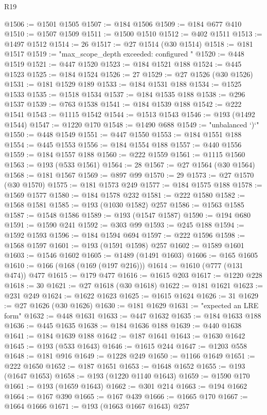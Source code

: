 \begin{lexlean}{R19}
\begin{coremodule}
@1506 := @1501 @1505
@1507 := @184 @1506
@1509 := @184 @677 @410
@1510 := @1507 @1509
@1511 := @1500 @1510
@1512 := @402 @1511
@1513 := @1497 @1512
@1514 := 26
@1517 := @27 @1514 (@30 @1514)
@1518 := @181 @1517
@1519 := "max_scope_depth exceeded: configured "
@1520 := @448 @1519
@1521 := @447 @1520
@1523 := @184 @1521 @188
@1524 := @445 @1523
@1525 := @184 @1524
@1526 := 27
@1529 := @27 @1526 (@30 @1526)
@1531 := @181 @1529 @189
@1533 := @184 @1531 @188
@1534 := @1525 @1533
@1535 := @1518 @1534
@1537 := @184 @1535 @188
@1538 := @296 @1537
@1539 := @763 @1538
@1541 := @184 @1539 @188
@1542 := @222 @1541
@1543 := @1115 @1542
@1544 := @1513 @1543
@1546 := @193 (@1492 @1544)
@1547 := @1220 @170
@1548 := @1490 @688
@1549 := "unbalanced `)`"
@1550 := @448 @1549
@1551 := @447 @1550
@1553 := @184 @1551 @188
@1554 := @445 @1553
@1556 := @184 @1554 @188
@1557 := @440 @1556
@1559 := @184 @1557 @188
@1560 := @222 @1559
@1561 := @1115 @1560
@1563 := @193 (@533 @1561)
@1564 := 28
@1567 := @27 @1564 (@30 @1564)
@1568 := @181 @1567
@1569 := @897 @99
@1570 := 29
@1573 := @27 @1570 (@30 @1570)
@1575 := @181 @1573 @249
@1577 := @184 @1575 @188
@1578 := @1569 @1577
@1580 := @184 @1578 @232
@1581 := @222 @1580
@1582 := @1568 @1581
@1585 := @193 (@1030 @1582) @257
@1586 := @1563 @1585
@1587 := @1548 @1586
@1589 := @193 (@1547 @1587)
@1590 := @194 @680
@1591 := @1590 @241
@1592 := @303 @99
@1593 := @245 @188
@1594 := @1592 @1593
@1596 := @184 @1594 @694
@1597 := @222 @1596
@1598 := @1568 @1597
@1601 := @193 (@1591 @1598) @257
@1602 := @1589 @1601
@1603 := @1546 @1602
@1605 := @1489 (@1491 @1603)
@1606 := @165 @1605
@1610 := @166 (@168 (@169 (@197 @216)))
@1614 := @1610 (@777 (@131 @474)) @477
@1615 := @179 @477
@1616 := @1615 @203
@1617 := @1220 @228
@1618 := 30
@1621 := @27 @1618 (@30 @1618)
@1622 := @181 @1621
@1623 := @231 @249
@1624 := @1622 @1623
@1625 := @1615 @1624
@1626 := 31
@1629 := @27 @1626 (@30 @1626)
@1630 := @181 @1629
@1631 := "expected an LRE form"
@1632 := @448 @1631
@1633 := @447 @1632
@1635 := @184 @1633 @188
@1636 := @445 @1635
@1638 := @184 @1636 @188
@1639 := @440 @1638
@1641 := @184 @1639 @188
@1642 := @187 @1641
@1643 := @1630 @1642
@1645 := @193 (@533 @1643)
@1646 := @1615 @244
@1647 := @1203 @558
@1648 := @181 @916
@1649 := @1228 @249
@1650 := @1166 @1649
@1651 := @222 @1650
@1652 := @187 @1651
@1653 := @1648 @1652
@1655 := @193 (@1647 @1653)
@1658 := @193 (@1220 @1140 @1643)
@1659 := @1590 @170
@1661 := @193 (@1659 @1643)
@1662 := @301 @214
@1663 := @194 @1662
@1664 := @167 @390
@1665 := @167 @439
@1666 := @1665 @170
@1667 := @1664 @1666
@1671 := @193 (@1663 @1667 @1643) @257

\end{coremodule}
\end{lexlean}
